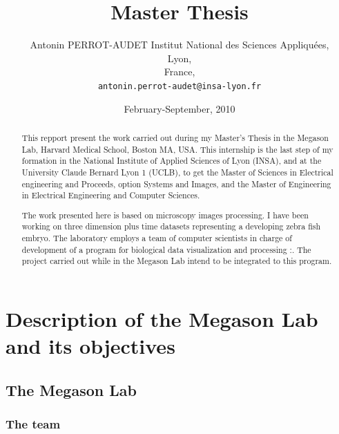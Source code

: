 




\title{Master Thesis} 
\author{Antonin PERROT-AUDET
  Institut National des Sciences Appliquées,\\
  Lyon,\\
  France,\\
  \texttt{antonin.perrot-audet@insa-lyon.fr}}   
\date{February-September, 2010} 
\maketitle


\begin{abstract}
  This repport present the work carried out during my Master's Thesis in the Megason Lab, Harvard Medical School, Boston MA, USA.
  This internship is the last step of my formation in the National Institute of Applied Sciences of Lyon (INSA), and at the University Claude Bernard Lyon 1 (UCLB), to get the Master of Sciences in Electrical engineering and Proceeds, option Systems and Images, and the Master of Engineering in Electrical Engineering and Computer Sciences.

  The work presented here is based on microscopy images processing. I have been working on three dimension plus time datasets representing a developing zebra fish embryo. 
  The laboratory employs a team of computer scientists in charge of development of a program for biological data visualization and processing :{\gofigure}\cite{refGofigure2}.
  The project carried out while in the Megason Lab intend to be integrated to this program.
  
\tableofcontents  
  
 
\end{abstract}


\chapter{Description of the Megason Lab and its objectives} 
{} 

\section{The Megason Lab}

\subsection{The team}

